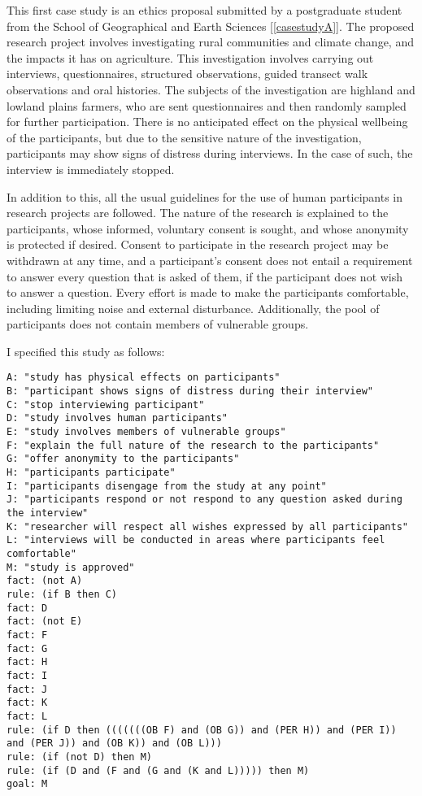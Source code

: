 \documentclass{l4proj}
\begin{document}
This first case study is an ethics proposal submitted by a postgraduate student from the School of Geographical and Earth Sciences [\ref{casestudyA}]. The proposed research project involves investigating rural communities and climate change, and the impacts it has on agriculture. This investigation involves carrying out interviews, questionnaires, structured observations, guided transect walk observations and oral histories. The subjects of the investigation are highland and lowland plains farmers, who are sent questionnaires and then randomly sampled for further participation. There is no anticipated effect on the physical wellbeing of the participants, but due to the sensitive nature of the investigation, participants may show signs of distress during interviews. In the case of such, the interview is immediately stopped. 

In addition to this, all the usual guidelines for the use of human participants in research projects are followed. The nature of the research is explained to the participants, whose informed, voluntary consent is sought, and whose anonymity is protected if desired. Consent to participate in the research project may be withdrawn at any time, and a participant's consent does not entail a requirement to answer every question that is asked of them, if the participant does not wish to answer a question. Every effort is made to make the participants comfortable, including limiting noise and external disturbance. Additionally, the pool of participants does not contain members of vulnerable groups. 

I specified this study as follows: 
\begin{verbatim}
A: "study has physical effects on participants"
B: "participant shows signs of distress during their interview"
C: "stop interviewing participant"
D: "study involves human participants"
E: "study involves members of vulnerable groups"
F: "explain the full nature of the research to the participants"
G: "offer anonymity to the participants"
H: "participants participate"
I: "participants disengage from the study at any point"
J: "participants respond or not respond to any question asked during the interview"
K: "researcher will respect all wishes expressed by all participants"
L: "interviews will be conducted in areas where participants feel comfortable"
M: "study is approved"
fact: (not A)
rule: (if B then C)
fact: D
fact: (not E)
fact: F
fact: G
fact: H
fact: I
fact: J 
fact: K
fact: L
rule: (if D then (((((((OB F) and (OB G)) and (PER H)) and (PER I)) and (PER J)) and (OB K)) and (OB L)))
rule: (if (not D) then M)
rule: (if (D and (F and (G and (K and L))))) then M)
goal: M
\end{verbatim}
\end{document}
